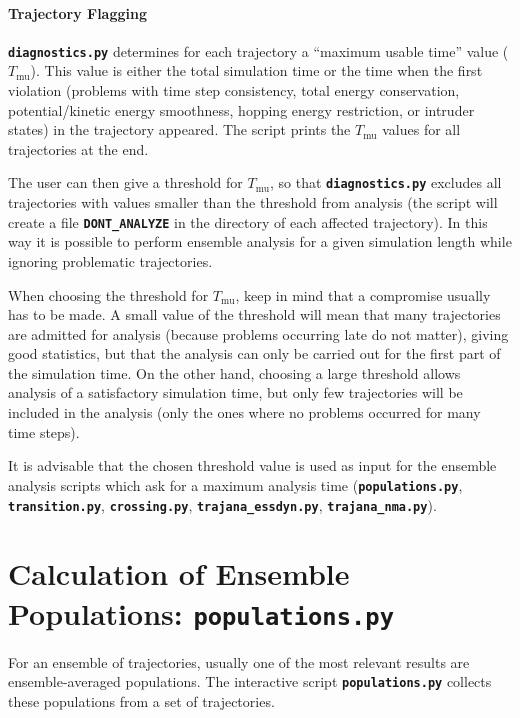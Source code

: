 \documentclass[a4paper,10pt,DIV=15,openany]{scrbook}
\newcommand{\ttt}[1]{\textbf{\texttt{#1}}}
\begin{document}
\paragraph{Trajectory Flagging}

\ttt{diagnostics.py} determines for each trajectory a ``maximum usable time'' value ($T_\text{mu}$).
This value is either the total simulation time or the time when the first violation (problems with time step consistency, total energy conservation, potential/kinetic energy smoothness, hopping energy restriction, or intruder states) in the trajectory appeared.
The script prints the $T_\text{mu}$ values for all trajectories at the end.

The user can then give a threshold for $T_\text{mu}$, so that \ttt{diagnostics.py} excludes all trajectories with values smaller than the threshold from analysis (the script will create a file \ttt{DONT\_ANALYZE} in the directory of each affected trajectory).
In this way it is possible to perform ensemble analysis for a given simulation length while ignoring problematic trajectories.

When choosing the threshold for $T_\text{mu}$, keep in mind that a compromise usually has to be made.
A small value of the threshold will mean that many trajectories are admitted for analysis (because problems occurring late do not matter), giving good statistics, but that the analysis can only be carried out for the first part of the simulation time.
On the other hand, choosing a large threshold allows analysis of a satisfactory simulation time, but only few trajectories will be included in the analysis (only the ones where no problems occurred for many time steps).

It is advisable that the chosen threshold value is used as input for the ensemble analysis scripts which ask for a maximum analysis time (\ttt{populations.py}, \ttt{transition.py}, \ttt{crossing.py}, \ttt{trajana\_essdyn.py}, \ttt{trajana\_nma.py}).







\section{Calculation of Ensemble Populations: \ttt{populations.py}}\label{sec:populations.py}

For an ensemble of trajectories, usually one of the most relevant results are ensemble-averaged populations. The interactive script \ttt{populations.py} collects these populations from a set of trajectories. 
\end{document}
